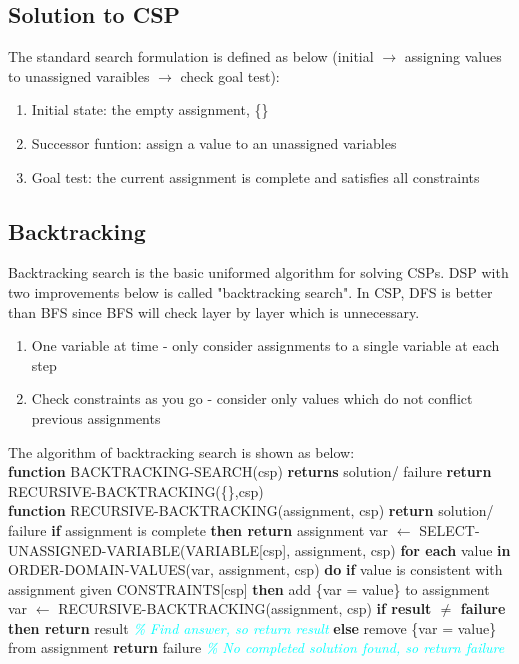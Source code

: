 \subsection{Solution to CSP}
The standard search formulation is defined as below (initial $\rightarrow$ assigning values to unassigned varaibles $\rightarrow$ check goal test):
\begin{enumerate}
    \item Initial state: the empty assignment, \{\}
    \item Successor funtion: assign a value to an unassigned variables
    \item Goal test: the current assignment is complete and satisfies all constraints
\end{enumerate}

\subsection{Backtracking}
Backtracking search is the basic uniformed algorithm for solving CSPs. DSP with two improvements below is called "backtracking search". In CSP, DFS is better than BFS since BFS will check layer by layer which is unnecessary. 
\begin{enumerate}
    \item One variable at time - only consider assignments to a single variable at each step
    \item Check constraints as you go - consider only values which do not conflict previous assignments
\end{enumerate}

\noindent
The algorithm of backtracking search is shown as below: \\
\tabto{0mm} \textbf{function} BACKTRACKING-SEARCH(csp) \textbf{returns} solution/ failure
\tabto{5mm} \textbf{return} RECURSIVE-BACKTRACKING(\{\},csp)
\\
\tabto{0mm} \textbf{function} RECURSIVE-BACKTRACKING(assignment, csp) \textbf{return} solution/ failure
\tabto{5mm} \textbf{if} assignment is complete \textbf{then return} assignment
\tabto{5mm} var $\leftarrow$ SELECT-UNASSIGNED-VARIABLE(VARIABLE[csp], assignment, csp)
\tabto{5mm} \textbf{for each} value \textbf{in} ORDER-DOMAIN-VALUES(var, assignment, csp) \textbf{do}
\tabto{10mm} \textbf{if} value is consistent with assignment given CONSTRAINTS[csp] \textbf{then}
\tabto{15mm} add \{var = value\} to assignment
\tabto{15mm} var $\leftarrow$ RECURSIVE-BACKTRACKING(assignment, csp)
\tabto{15mm} \textbf{if result $\neq$ failure}
\tabto{20mm} \textbf{then return} result \textcolor{cyan}{\emph{\% Find answer, so return result}}
\tabto{20mm} \textbf{else} remove \{var = value\} from assignment
\tabto{5mm} \textbf{return} failure  \textcolor{cyan}{\emph{\% No completed solution found, so return failure}}


